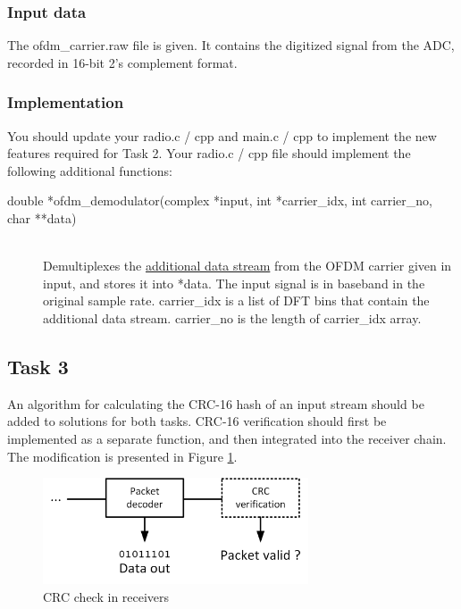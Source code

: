 \documentclass{article}
\begin{document}
\subsubsection{Input data}
The \textsf{ofdm\_carrier.raw} file is given. It contains the digitized signal from the ADC, recorded in 16-bit 2's complement format.

\subsubsection{Implementation}
You should update your \textsf{radio.c / cpp} and \textsf{main.c / cpp} to implement the new features required for Task 2. Your \textsf{radio.c / cpp} file should implement the following additional functions:
\begin{description}
	\item[double *ofdm\_demodulator(complex *input, int *carrier\_idx, int carrier\_no, char **data)]
	\,\\ Demultiplexes the \underline{additional data stream} from the OFDM carrier given in \textsf{input}, and stores it into \textsf{*data}. The input signal is in baseband in the original sample rate. \textsf{carrier\_idx} is a list of DFT bins that contain the additional data stream. \textsf{carrier\_no} is the length of \textsf{carrier\_idx} array.
\end{description}

\subsection{Task 3}
An algorithm for calculating the CRC-16 hash of an input stream should be added to solutions for both tasks. CRC-16 verification should first be implemented as a separate function, and then integrated into the receiver chain. The modification is presented in Figure \ref{fig:task3}.

\begin{figure}[h!]
\centering
\includegraphics[width=0.7\textwidth]{Images/Task3.png}
\caption{CRC check in receivers}
\label{fig:task3}
\end{figure}
\end{document}

